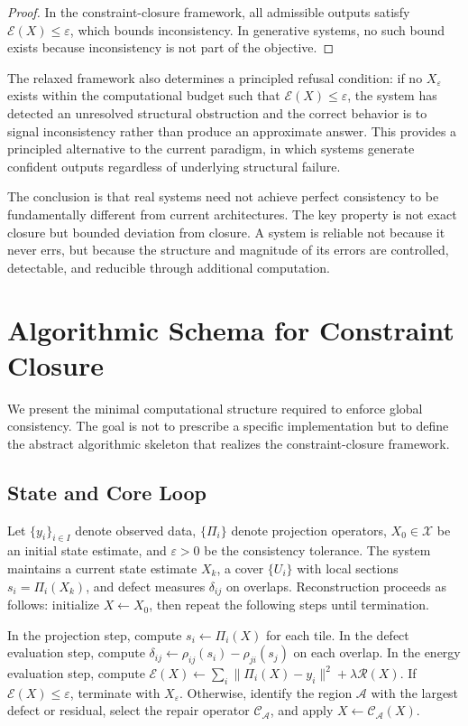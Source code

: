 \documentclass[11pt, oneside]{article}
\begin{document}
\begin{proof}
In the constraint-closure framework, all admissible outputs satisfy $\mathcal{E}(X) \leq \varepsilon$, which bounds inconsistency. In generative systems, no such bound exists because inconsistency is not part of the objective.
\end{proof}

The relaxed framework also determines a principled refusal condition: if no $X_\varepsilon$ exists within the computational budget such that $\mathcal{E}(X) \leq \varepsilon$, the system has detected an unresolved structural obstruction and the correct behavior is to signal inconsistency rather than produce an approximate answer. This provides a principled alternative to the current paradigm, in which systems generate confident outputs regardless of underlying structural failure.

The conclusion is that real systems need not achieve perfect consistency to be fundamentally different from current architectures. The key property is not exact closure but bounded deviation from closure. A system is reliable not because it never errs, but because the structure and magnitude of its errors are controlled, detectable, and reducible through additional computation.

\section{Algorithmic Schema for Constraint Closure}

We present the minimal computational structure required to enforce global consistency. The goal is not to prescribe a specific implementation but to define the abstract algorithmic skeleton that realizes the constraint-closure framework.

\subsection{State and Core Loop}

Let $\{y_i\}_{i \in I}$ denote observed data, $\{\Pi_i\}$ denote projection operators, $X_0 \in \mathcal{X}$ be an initial state estimate, and $\varepsilon > 0$ be the consistency tolerance. The system maintains a current state estimate $X_k$, a cover $\{U_i\}$ with local sections $s_i = \Pi_i(X_k)$, and defect measures $\delta_{ij}$ on overlaps. Reconstruction proceeds as follows: initialize $X \leftarrow X_0$, then repeat the following steps until termination.

In the projection step, compute $s_i \leftarrow \Pi_i(X)$ for each tile. In the defect evaluation step, compute $\delta_{ij} \leftarrow \rho_{ij}(s_i) - \rho_{ji}(s_j)$ on each overlap. In the energy evaluation step, compute $\mathcal{E}(X) \leftarrow \sum_i \|\Pi_i(X) - y_i\|^2 + \lambda \mathcal{R}(X)$. If $\mathcal{E}(X) \leq \varepsilon$, terminate with $X_\varepsilon$. Otherwise, identify the region $\mathcal{A}$ with the largest defect or residual, select the repair operator $\mathcal{C}_\mathcal{A}$, and apply $X \leftarrow \mathcal{C}_\mathcal{A}(X)$.
\end{document}
